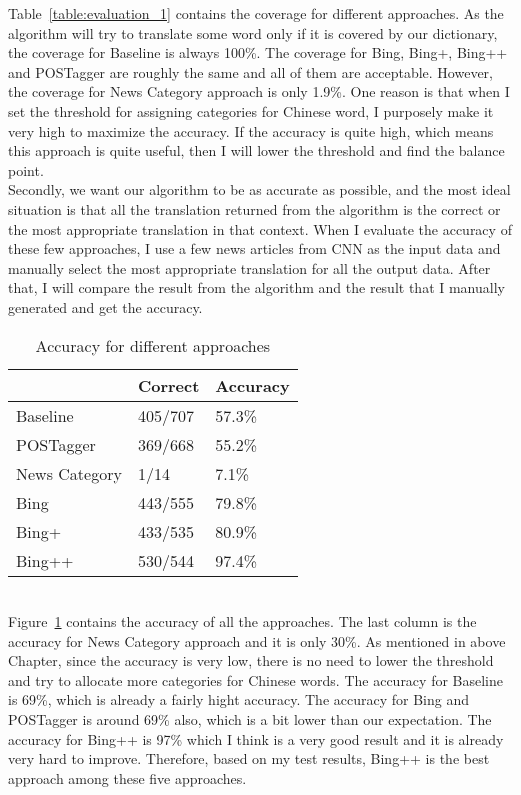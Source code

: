 Table~\ref{table:evaluation_1} contains the coverage for different approaches. As the algorithm will try to translate some word only if it is covered by our dictionary, the coverage for Baseline is always 100\%. The coverage for Bing, Bing+, Bing++ and POSTagger are roughly the same and all of them are acceptable. However, the coverage for News Category approach is only 1.9\%. One reason is that when I set the threshold for assigning categories for Chinese word, I purposely make it very high to maximize the accuracy. If the accuracy is quite high, which means this approach is quite useful, then I will lower the threshold and find the balance point.
\\
Secondly, we want our algorithm to be as accurate as possible, and the most ideal situation is that all the translation returned from the algorithm is the correct or the most appropriate translation in that context. When I evaluate the accuracy of these few approaches, I use a few news articles from CNN as the input data and manually select the most appropriate translation for all the output data. After that, I will compare the result from the algorithm and the result that I manually generated and get the accuracy.
\\
\begin{table}[ht]
  \caption{Accuracy for different approaches}
  \label{table:evaluation_3}
  \begin{tabular}{| p{2cm} | p{2cm} | p{2cm} |}
    \hline
     & Correct & Accuracy\\
    \hline
    Baseline & 405/707 & 57.3\%\\
    \hline
    POSTagger & 369/668 & 55.2\%\\
    \hline
    News Category & 1/14 & 7.1\%\\
    \hline
    Bing & 443/555 & 79.8\%\\
    \hline
    Bing+ & 433/535 & 80.9\%\\
    \hline
    Bing++ & 530/544 & 97.4\%\\
    \hline
  \end{tabular}
\end{table}
\\
Figure~\ref{table:evaluation_3} contains the accuracy of all the approaches. The last column is the accuracy for News Category approach and it is only 30\%. As mentioned in above Chapter, since the accuracy is very low, there is no need to lower the threshold and try to allocate more categories for Chinese words. The accuracy for Baseline is 69\%, which is already a fairly hight accuracy. The accuracy for Bing and POSTagger is around 69\% also, which is a bit lower than our expectation. The accuracy for Bing++ is 97\% which I think is a very good result and it is already very hard to improve. Therefore, based on my test results, Bing++ is the best approach among these five approaches.
\\